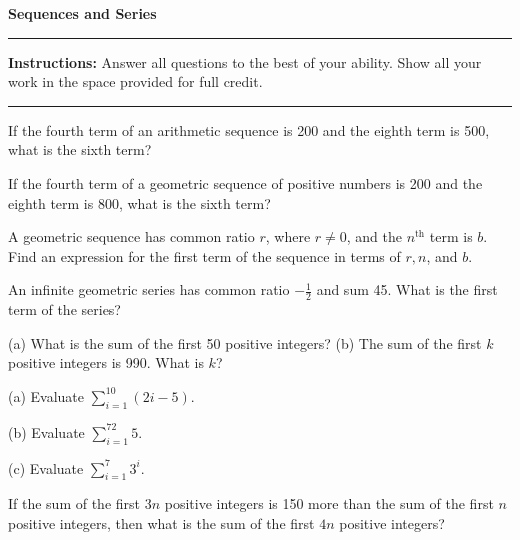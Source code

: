 \documentclass[12pt]{exam}
\newcommand{\examtitle}{Sequences and Series}
\newcommand{\instructions}{
    \noindent\rule{\textwidth}{0.5pt}
    \begin{center}
    \textbf{Instructions:} Answer all questions to the best of your ability. Show all your work in the space provided for full credit.
    \end{center}
    \noindent\rule{\textwidth}{0.5pt}
}
\begin{document}
\begin{center}
\textbf{\Large \examtitle} \\
\vspace{0.5cm}
\hspace{0.1\textwidth}
\end{center}

\instructions
\vspace{0.5cm}

\begin{questions}

\pointsinrightmargin

\question[8]
If the fourth term of an arithmetic sequence is 200 and the eighth term is 500, what is the sixth term?
\vspace*{4cm}

\question[8]
If the fourth term of a geometric sequence of positive numbers is 200 and the eighth term is 800, what is the sixth term?
\vspace*{4cm}

\question[8]
A geometric sequence has common ratio $r$, where $r \neq 0$, and the $n^{\text{th}}$ term is $b$. Find an expression for the first term of the sequence in terms of $r, n$, and $b$.
\vspace*{4cm}

\newpage

\question[10]
An infinite geometric series has common ratio $-\frac{1}{2}$ and sum 45. What is the first term of the series?
\vspace*{4cm}

\question[12]
(a) What is the sum of the first 50 positive integers?
\vspace*{3cm}
(b) The sum of the first $k$ positive integers is 990. What is $k$?
\vspace*{3cm}

\newpage

\question[12]
(a) Evaluate $\sum_{i=1}^{10} (2i - 5)$.
\vspace*{3cm}

(b) Evaluate $\sum_{i=1}^{72} 5$.
\vspace*{3cm}

(c) Evaluate $\sum_{i=1}^{7} 3^i$.
\vspace*{3cm}

\newpage

\question[12]
If the sum of the first $3n$ positive integers is 150 more than the sum of the first $n$ positive integers, then what is the sum of the first $4n$ positive integers?
\vspace*{5cm}


\end{questions}
\end{document}
